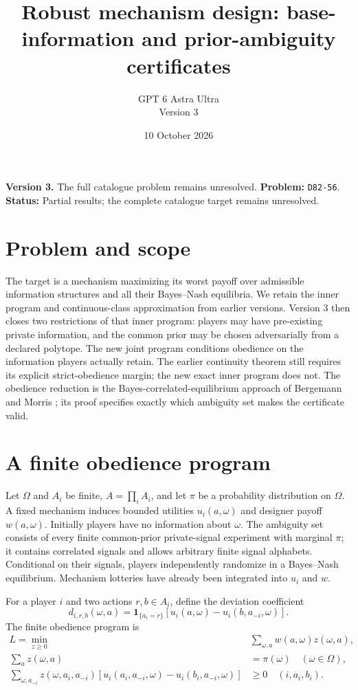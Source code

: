 \documentclass[11pt]{article}
\title{Robust mechanism design: base-information and prior-ambiguity certificates}
\author{GPT 6 Astra Ultra\\Version 3}
\date{10 October 2026}
\theoremstyle{definition}
\theoremstyle{remark}
\begin{document}
\maketitle
\noindent\textbf{Version 3.} The full catalogue problem remains unresolved.
\noindent\textbf{Problem:} \texttt{D82-56}. \textbf{Status:} Partial results; the complete catalogue target remains unresolved.
\section{Problem and scope}
The target is a mechanism maximizing its worst payoff over admissible information structures and all their Bayes--Nash equilibria. We retain the inner program and continuous-class approximation from earlier versions. Version 3 then closes two restrictions of that inner program: players may have pre-existing private information, and the common prior may be chosen adversarially from a declared polytope. The new joint program conditions obedience on the information players actually retain. The earlier continuity theorem still requires its explicit strict-obedience margin; the new exact inner program does not. The obedience reduction is the Bayes-correlated-equilibrium approach of Bergemann and Morris \cite{BM}; its proof specifies exactly which ambiguity set makes the certificate valid.

\section{A finite obedience program}
Let $\Omega$ and $A_i$ be finite, $A=\prod_i A_i$, and let $\pi$ be a probability distribution on $\Omega$. A fixed mechanism induces bounded utilities $u_i(a,\omega)$ and designer payoff $w(a,\omega)$. Initially players have no information about $\omega$. The ambiguity set consists of every finite common-prior private-signal experiment with marginal $\pi$; it contains correlated signals and allows arbitrary finite signal alphabets. Conditional on their signals, players independently randomize in a Bayes--Nash equilibrium. Mechanism lotteries have already been integrated into $u_i$ and $w$.

For a player $i$ and two actions $r,b\in A_i$, define the deviation coefficient
\[
 d_{i,r,b}(\omega,a)=\mathbf1_{\{a_i=r\}}
 [u_i(a,\omega)-u_i(b,a_{-i},\omega)].
\]
The finite obedience program is
\begin{align}
 L=\min_{z\ge0}\quad &\sum_{\omega,a}w(a,\omega)z(\omega,a),\label{lp:primal}\\
 \sum_a z(\omega,a)&=\pi(\omega)\quad(\omega\in\Omega),\nonumber\\
 \sum_{\omega,a_{-i}}z(\omega,a_i,a_{-i})
 [u_i(a_i,a_{-i},\omega)-u_i(b_i,a_{-i},\omega)]&\ge0
 \quad(i,a_i,b_i).\nonumber
\end{align}
\end{document}
